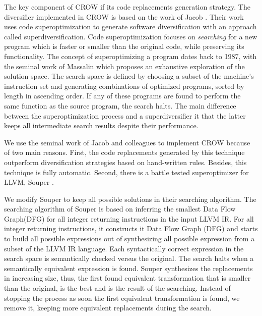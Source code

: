 
The key component of CROW if its code replacements generation strategy. The diversifier implemented in CROW is based on the work of Jacob \etal \cite{jacob2008superdiversifier}. Their work uses code superoptimization to generate software diversification with an approach called superdiversification. 
Code superoptimization focuses on \emph{searching} for a new program which is faster or smaller than the original code, while preserving its functionality.
The concept of superoptimizing a program dates back to 1987, with the seminal work of Massalin \cite{Massalin1987} which proposes an exhaustive exploration of the solution space. The search space is defined by choosing a subset of the machine's instruction set and generating combinations of optimized programs, sorted by length in ascending order. If any of these programs are found to perform the same function as the source program, the search halts. The main difference between the superoptimization process and a superdiversifier it that the latter keeps all intermediate search results despite their performance. 

We use the seminal work of Jacob and colleagues to implement CROW because of two main reasons.
First, the code replacements generated by this technique outperform diversification strategies based on hand-written rules. Besides, this technique is fully automatic.
Second, there is a battle tested superoptimizer for LLVM, Souper \cite{Sasnauskas2017Souper:Superoptimizer}. 

We modify Souper to keep all possible solutions in their searching algorithm. The searching algorithm of Souper is based on inferring the smallest Data Flow Graph(DFG) for all integer returning instructions in the input LLVM IR. For all integer returning instructions, it constructs it Data Flow Graph (DFG) and starts to build all possible expressions out of synthesizing all possible expression from a subset of the LLVM IR language. Each syntactically correct expression in the search space is semantically checked versus the original. The search halts when a semantically equivalent expression is found. Souper synthesizes the replacements in increasing size, thus, the first found equivalent transformation that is smaller than the original, is the best and is the result of the searching. Instead of stopping the process as soon the first equivalent transformation is found, we remove it, keeping more equivalent replacements during the search.

